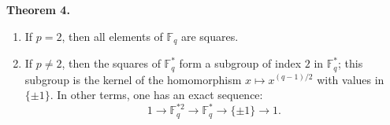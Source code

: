 \textbf{Theorem 4.}
\begin{enumerate}
\item[(a)] If $p = 2$, then all elements of $\mathbb{F}_q$ are squares.
\item[(b)] If $p \neq 2$, then the squares of $\mathbb{F}_q^*$ form a subgroup of index $2$ in $\mathbb{F}_q^*$; this subgroup is the kernel of the homomorphism $x \mapsto x^{(q-1)/2}$ with values in $\{\pm 1\}$. In other terms, one has an exact sequence:
$$1 \to \mathbb{F}_q^{*2} \to \mathbb{F}_q^* \to \{\pm 1\} \to 1.$$
\end{enumerate}
